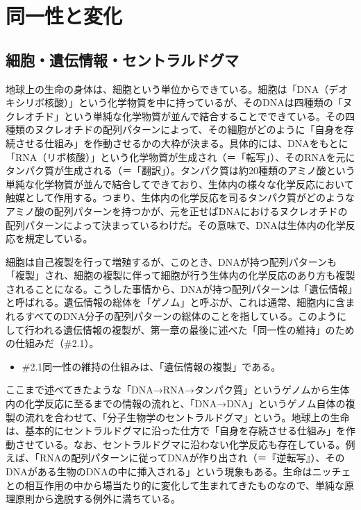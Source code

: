 \section{同一性と変化}\label{ux540cux4e00ux6027ux3068ux5909ux5316}

\subsection{細胞・遺伝情報・セントラルドグマ}\label{ux7d30ux80deux907aux4f1dux60c5ux5831ux30bbux30f3ux30c8ux30e9ux30ebux30c9ux30b0ux30de}

地球上の生命の身体は、細胞という単位からできている。細胞は「DNA（デオキシリボ核酸）」という化学物質を中に持っているが、そのDNAは四種類の「ヌクレオチド」という単純な化学物質が並んで結合することでできている。その四種類のヌクレオチドの配列パターンによって、その細胞がどのように「自身を存続させる仕組み」を作動させるかの大枠が決まる。具体的には、DNAをもとに「RNA（リボ核酸）」という化学物質が生成され（＝「転写」）、そのRNAを元にタンパク質が生成される（＝「翻訳」）。タンパク質は約20種類のアミノ酸という単純な化学物質が並んで結合してできており、生体内の様々な化学反応において触媒として作用する。つまり、生体内の化学反応を司るタンパク質がどのようなアミノ酸の配列パターンを持つかが、元を正せばDNAにおけるヌクレオチドの配列パターンによって決まっているわけだ。その意味で、DNAは生体内の化学反応を規定している。

細胞は自己複製を行って増殖するが、このとき、DNAが持つ配列パターンも「複製」され、細胞の複製に伴って細胞が行う生体内の化学反応のあり方も複製されることになる。こうした事情から、DNAが持つ配列パターンは「遺伝情報」と呼ばれる。遺伝情報の総体を「ゲノム」と呼ぶが、これは通常、細胞内に含まれるすべてのDNA分子の配列パターンの総体のことを指している。このようにして行われる遺伝情報の複製が、第一章の最後に述べた「同一性の維持」のための仕組みだ（\#2.1）。

\begin{note}{}
  \begin{itemize}
    \tightlist
    \item{\#2.1}同一性の維持の仕組みは、「遺伝情報の複製」である。
  \end{itemize}
\end{note}

ここまで述べてきたような「DNA→RNA→タンパク質」というゲノムから生体内の化学反応に至るまでの情報の流れと、「DNA→DNA」というゲノム自体の複製の流れを合わせて、「分子生物学のセントラルドグマ」という。地球上の生命は、基本的にセントラルドグマに沿った仕方で「自身を存続させる仕組み」を作動させている。なお、セントラルドグマに沿わない化学反応も存在している。例えば、「RNAの配列パターンに従ってDNAが作り出され（＝『逆転写』）、そのDNAがある生物のDNAの中に挿入される」という現象もある。生命はニッチェとの相互作用の中から場当たり的に変化して生まれてきたものなので、単純な原理原則から逸脱する例外に満ちている。

